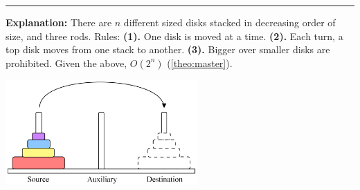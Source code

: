 \begin{Func}

    \label{TowersOfHanoi}
    \vspace{-.5em}
    \begin{algorithm}[H]
        \SetAlgoLined
    \end{algorithm}
    \noindent
    \rule{\textwidth}{0.4pt}
    \textbf{Explanation:} There are $n$ different sized disks stacked in decreasing order of size, and three rods. Rules:
    \textbf{(1).} One disk is moved at a time. \textbf{(2).} Each turn, a top disk moves from one stack to another. \textbf{(3).} Bigger over smaller disks are prohibited.
    Given the above, $O(2^n)$ (\ref{theo:master}).
    \begin{center}
        \includegraphics[width=0.55\textwidth]{Sections/hard/hanoi.png}
    \end{center}
    
\end{Func}

\newpage 

